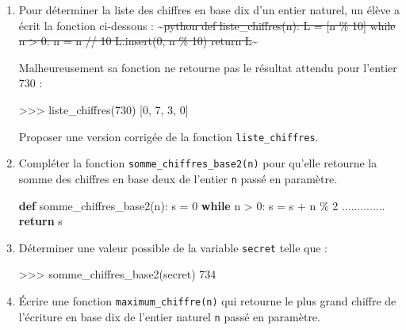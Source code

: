 \documentclass[11pt]{article}
\newenvironment{Shaded}{}{}
\newcommand{\KeywordTok}[1]{\textcolor[rgb]{0.00,0.44,0.13}{\textbf{{#1}}}}
\newcommand{\DecValTok}[1]{\textcolor[rgb]{0.25,0.63,0.44}{{#1}}}
\newcommand{\NormalTok}[1]{{#1}}
\newcommand{\ControlFlowTok}[1]{\textcolor[rgb]{0.00,0.44,0.13}{\textbf{{#1}}}}
\newcommand{\OperatorTok}[1]{\textcolor[rgb]{0.40,0.40,0.40}{{#1}}}
\begin{document}
\begin{enumerate}
\def\labelenumi{\arabic{enumi}.}
\item
  Pour déterminer la liste des chiffres en base dix d'un entier naturel,
  un élève a écrit la fonction ci-dessous :
  \textasciitilde{}\sout{python def liste\_chiffres(n): L = {[}n \%
  10{]} while n \textgreater{} 0: n = n // 10 L.insert(0, n \% 10)
  return L}\textasciitilde{}

  Malheureusement sa fonction ne retourne pas le résultat attendu pour
  l'entier \(730\) :

\begin{Shaded}
\begin{Highlighting}[]
\OperatorTok{>>>}\NormalTok{ liste\_chiffres(}\DecValTok{730}\NormalTok{)}
\NormalTok{[}\DecValTok{0}\NormalTok{, }\DecValTok{7}\NormalTok{, }\DecValTok{3}\NormalTok{, }\DecValTok{0}\NormalTok{]}
\end{Highlighting}
\end{Shaded}

  Proposer une version corrigée de la fonction \texttt{liste\_chiffres}.
\item
  Compléter la fonction \texttt{somme\_chiffres\_base2(n)} pour qu'elle
  retourne la somme des chiffres en base deux de l'entier \texttt{n}
  passé en paramètre.

\begin{Shaded}
\begin{Highlighting}[]
\KeywordTok{def}\NormalTok{ somme\_chiffres\_base2(n):}
\NormalTok{    s }\OperatorTok{=} \DecValTok{0}
    \ControlFlowTok{while}\NormalTok{ n }\OperatorTok{>} \DecValTok{0}\NormalTok{:}
\NormalTok{        s }\OperatorTok{=}\NormalTok{ s }\OperatorTok{+}\NormalTok{ n }\OperatorTok{\%} \DecValTok{2}
\NormalTok{        ..............}
    \ControlFlowTok{return}\NormalTok{ s}
\end{Highlighting}
\end{Shaded}
\item
  Déterminer une valeur possible de la variable \texttt{secret} telle
  que :

\begin{Shaded}
\begin{Highlighting}[]
\OperatorTok{>>>}\NormalTok{ somme\_chiffres\_base2(secret)}
\DecValTok{734}
\end{Highlighting}
\end{Shaded}
\item
  Écrire une fonction \texttt{maximum\_chiffre(n)} qui retourne le plus
  grand chiffre de l'écriture en base dix de l'entier naturel \texttt{n}
  passé en paramètre.
\end{enumerate}
\end{document}

